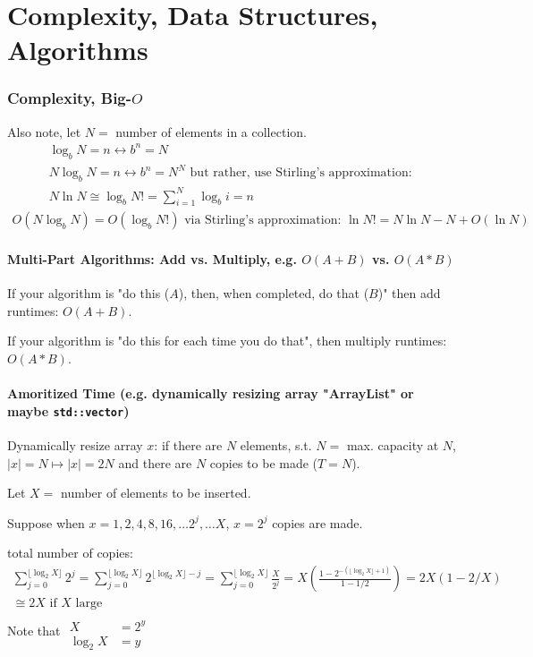 \documentclass[10pt]{amsart}
\begin{document}
\part{Complexity, Data Structures, Algorithms}

\section{Complexity, Big-$O$}

Also note, let $N = $ number of elements in a collection.
\[
\begin{gathered}
\log_b{N} = n \leftrightarrow b^n = N \\ 
N \log_b{N} = n \leftrightarrow b^n = N^N \text{ but rather, use Stirling's approximation: } \\
N \ln N \cong \log_b{N!} = \sum_{i=1}^N \log_b{i} = n  
\end{gathered}
\]
\[
\begin{gathered}
O(N\log_b{N}) = O(\log_b{N!}) \text{ via Stirling's approximation: } \ln{N!} = N\ln{N} - N + O(\ln{N})
\end{gathered}
\]

\subsection{Multi-Part Algorithms: Add vs. Multiply, e.g. $O(A + B)$ vs. $O(A*B)$}

If your algorithm is "do this ($A$), then, when completed, do that ($B$)" then add runtimes: $O(A+B)$.

If your algorithm is "do this for each time you do that", then multiply runtimes: $O(A*B)$.

\subsection{Amoritized Time (e.g. dynamically resizing array "ArrayList" or maybe \texttt{std::vector})}

Dynamically resize array $x$: if there are $N$ elements, s.t. $N= $ max. capacity at $N$, $|x| = N \mapsto |x| = 2N$ and there are $N$ copies to be made ($T=N$). 

Let $X = $ number of elements to be inserted. 

Suppose when $x=1, 2, 4, 8, 16, \dots 2^j, \dots X$, $x= 2^j$ copies are made. 

total number of copies:
\[
\begin{gathered}
\sum_{j=0}^{ \lfloor \log_2{X} \rfloor } 2^j = \sum_{j=0}^{ \lfloor \log_2{X} \rfloor } 2^{ \lfloor \log_2{X} \rfloor - j} = \sum_{j=0}^{ \lfloor \log_2{X} \rfloor } \frac{X}{2^j} = X\left( \frac{ 1 - 2^{ - (\lfloor \log_2{X} \rfloor  + 1)} }{ 1 - 1/2} \right) = 2X \left( 1 - 2/X \right) \\
\cong 2X \text{ if $X$ large } 
\end{gathered}
\]
Note that $\begin{aligned} & \quad \\ 
X & = 2^y \\ 
\log_2{X} & = y \end{aligned}$ 
\end{document}
